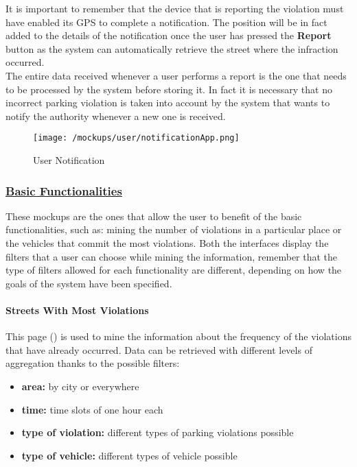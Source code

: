 			It is important to remember that the device that is reporting the violation must have enabled its GPS to complete a notification. The position will be in fact added to the details of the notification once the user has pressed the \textbf{Report} button as the system can automatically retrieve the street where the infraction occurred.\\
			
			The entire data received whenever a user performs a report is the one that needs to be processed by the system before storing it. In fact it is necessary that no incorrect parking violation is taken into account by the system that wants to notify the authority whenever a new one is received.
			
			\begin{figure}[ht!]
				\centering
				\texttt{[image: /mockups/user/notificationApp.png]}
				\caption{\label{fig:notificationApp} User Notification}
			\end{figure}
		
		\subsubsection[Basic Functionalities]{\hyperlink{toc}{Basic Functionalities}}
			\label{sec:userBasicFunctionalities}
			
			These mockups are the ones that allow the user to benefit of the basic functionalities, such as: mining the number of violations in a particular place or the vehicles that commit the most violations. Both the interfaces display the filters that a user can choose while mining the information, remember that the type of filters allowed for each functionality are different, depending on how the goals of the system have been specified.
			
			\paragraph{Streets With Most Violations}
			This page () is used to mine the information about the frequency of the violations that have already occurred. Data can be retrieved with different levels of aggregation thanks to the possible filters:
			
			\begin{itemize}
				\item \textbf{area:} by city or everywhere
				\item \textbf{time:} time slots of one hour each
				\item \textbf{type of violation:} different types of parking violations possible
				\item \textbf{type of vehicle:} different types of vehicle possible
			\end{itemize}
		
